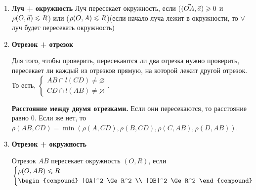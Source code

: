 \begin{enumerate}
    Если луч пересекает отрезок, тогда: $\begin{cases}
        l(P) \cdot l(Q) \Le 0 \\
        \angle PAD + \angle DAQ \Le \pi,
    \end{cases}$

    где $l$ - прямая, на которой лежит луч. 
    
    Последнее утверждение нужно для того, чтобы точки отрезка находились после точки-начала

    На центральном и правом изображениях приведены примеры, когда нарушается каждый из пунктов соответственно.
    \item \textbf{Луч + окружность} 
    Луч пересекает окружность, если ($(\Vec{OA}, \Vec{a}) \geqslant 0$ и $\rho(O, \Vec{a}) \leqslant R$) или ($\rho(O, A) \leqslant R$)(если начало луча лежит в окружности, то $\forall$ луч будет пересекать окружность)


    \item \textbf{Отрезок + отрезок}

    Для того, чтобы проверить, пересекаются ли два отрезка нужно проверить, пересекает ли каждый из отрезков прямую, на которой лежит другой отрезок. То есть, $\begin{cases}
        AB \cap l(CD) \neq \varnothing \\
        CD \cap l(AB) \neq \varnothing
    \end{cases}$.

    \textbf{Расстояние между двумя отрезками.} Если они пересекаются, то расстояние равно 0. Если же нет, то $\rho(AB, CD) = \min(\rho(A, CD), \rho(B, CD), \rho(C, AB), \rho(D, AB))$.

    
    \item \textbf{Отрезок + окружность}
    
    Отрезок $AB$ пересекает окружность $(O, R)$, если $\begin{cases}
        \rho(O, AB) \Le R \\
        \begin{compound}
        |OA|^2 \Ge R^2 \\
        |OB|^2 \Ge R^2
        \end{compound}
    \end{cases}$
    
    

\end{enumerate}
